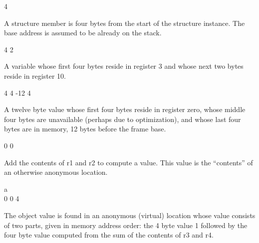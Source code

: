  4
\begin{myindentpara}{1cm}
A structure member is four bytes from the start of the structure
instance. The base address is assumed to be already on the stack.
\end{myindentpara}

  4   2
\begin{myindentpara}{1cm}
A variable whose first four bytes reside in register 3 and whose next
two bytes reside in register 10.
\end{myindentpara}

  4  4  -12  4
\begin{myindentpara}{1cm}
A twelve byte value whose first four bytes reside in register zero,
whose middle four bytes are unavailable (perhaps due to optimization),
and whose last four bytes are in memory, 12 bytes before the frame
base.
\end{myindentpara}

 0  0  
\begin{myindentpara}{1cm}
Add the contents of r1 and r2 to compute a value. This value is the
“contents” of an otherwise anonymous location.
\end{myindentpara}

   a \\
 0  0    4
\begin{myindentpara}{1cm}
The object value is found in an anonymous (virtual) location whose
value consists of two parts, given in memory address order: the 4 byte
value 1 followed by the four byte value computed from the sum of the
contents of r3 and r4.
\end{myindentpara}


